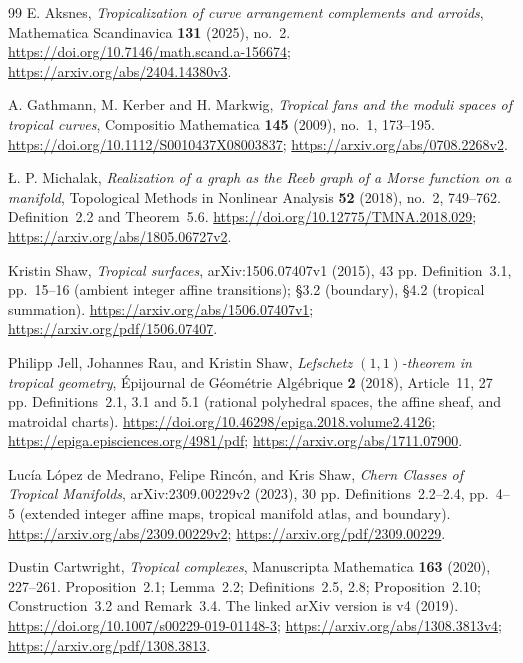 \begin{thebibliography}{99}
E. Aksnes,
\emph{Tropicalization of curve arrangement complements and arroids},
Mathematica Scandinavica \textbf{131} (2025), no.~2.
\url{https://doi.org/10.7146/math.scand.a-156674};
\url{https://arxiv.org/abs/2404.14380v3}.

A. Gathmann, M. Kerber and H. Markwig,
\emph{Tropical fans and the moduli spaces of tropical curves},
Compositio Mathematica \textbf{145} (2009), no.~1, 173--195.
\url{https://doi.org/10.1112/S0010437X08003837};
\url{https://arxiv.org/abs/0708.2268v2}.

\L{}. P. Michalak,
\emph{Realization of a graph as the Reeb graph of a Morse function on a manifold},
Topological Methods in Nonlinear Analysis \textbf{52} (2018), no.~2, 749--762.
Definition~2.2 and Theorem~5.6.
\url{https://doi.org/10.12775/TMNA.2018.029};
\url{https://arxiv.org/abs/1805.06727v2}.


Kristin Shaw,
\emph{Tropical surfaces},
arXiv:1506.07407v1 (2015), 43 pp.
Definition~3.1, pp.~15--16 (ambient integer affine transitions);
\S3.2 (boundary), \S4.2 (tropical summation).
\url{https://arxiv.org/abs/1506.07407v1};
\url{https://arxiv.org/pdf/1506.07407}.

Philipp Jell, Johannes Rau, and Kristin Shaw,
\emph{Lefschetz $(1,1)$-theorem in tropical geometry},
\'Epijournal de G\'eom\'etrie Alg\'ebrique \textbf{2} (2018), Article~11, 27 pp.
Definitions~2.1, 3.1 and 5.1 (rational polyhedral spaces, the affine sheaf, and matroidal charts).
\url{https://doi.org/10.46298/epiga.2018.volume2.4126};
\url{https://epiga.episciences.org/4981/pdf};
\url{https://arxiv.org/abs/1711.07900}.

Luc\'ia L\'opez de Medrano, Felipe Rinc\'on, and Kris Shaw,
\emph{Chern Classes of Tropical Manifolds},
arXiv:2309.00229v2 (2023), 30 pp.
Definitions~2.2--2.4, pp.~4--5 (extended integer affine maps, tropical manifold atlas, and boundary).
\url{https://arxiv.org/abs/2309.00229v2};
\url{https://arxiv.org/pdf/2309.00229}.

Dustin Cartwright,
\emph{Tropical complexes},
Manuscripta Mathematica \textbf{163} (2020), 227--261.
Proposition~2.1; Lemma~2.2; Definitions~2.5, 2.8;
Proposition~2.10; Construction~3.2 and Remark~3.4.
The linked arXiv version is v4 (2019).
\url{https://doi.org/10.1007/s00229-019-01148-3};
\url{https://arxiv.org/abs/1308.3813v4};
\url{https://arxiv.org/pdf/1308.3813}.


\end{thebibliography}
